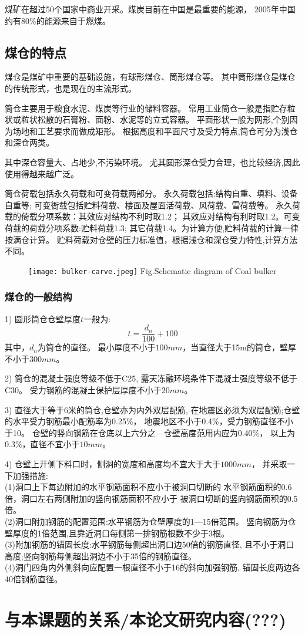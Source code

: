 煤矿在超过50个国家中商业开采。煤炭目前在中国是最重要的能源，
2005年中国约有$80\%$的能源来自于燃煤。

\subsection{煤仓的特点}
煤仓是煤矿中重要的基础设施，有球形煤仓、筒形煤仓等。
其中筒形煤仓是煤仓的传统形式，也是现在的主流形式。

筒仓主要用于粮食水泥、煤炭等行业的储料容器。
常用工业筒仓一般是指贮存粒状或粒状松散的石膏粉、面粉、水泥等的立式容器。
平面形状一般为网形,个别因为场地和工艺要求而做成矩形。
根据高度和平面尺寸及受力特点,筒仓可分为浅仓和深仓两类。

其中深仓容量大、占地少,不污染环境。
尤其圆形深仓受力合理，也比较经济,因此使用得越来越广泛。

筒仓荷载包括永久荷载和可变荷载两部分。
永久荷载包括:结构自重、填料、设备自重等;
可变衙载包括贮料荷载、楼面及屋面活荷载、风荷载、雪荷载等。
永久荷载的倚载分项系数：其效应对结构不利时取1.2；
其效应对结构有利时取1.2。可变荷载的荷载分项系数:贮料荷载1.3;
其它荷载1.4。为计算方便,贮料荷载的计算一律按满仓计算。
贮料荷载对仓壁的压力标准值，根据浅仓和深仓受力特性,计算方法不同。
\begin{figure}[!htbp]
   \centering
   \texttt{[image: bulker-carve.jpeg]}
								{Fig.}{Schematic diagram of Coal bulker}
\end{figure}

\subsubsection*{煤仓的一般结构}
1) 圆形筒仓仓壁厚度$t$一般为:
\begin{equation}
t=\frac{d_n}{100}+100
\end{equation}
其中，$d_n$为筒仓的直径。
最小厚度不小于$100mm$，当直径大于15m的筒仓，壁厚不小于$300mm$。

2) 筒仓的混凝土强度等级不低于C25,
	露天冻融环境条件下混凝土强度等级不低于C30。
	受力钢筋的混凝土保护层厚度不小于$20mm$。

3) 直径大于等于6米的筒仓,仓壁亦为内外双层配筋,
	在地震区必须为双层配筋;仓壁的水平受力钢筋最小配筋率为0.25\%，
	地震地区不小于0.4\%，受力钢筋直径不小于10。
	仓壁的竖向钢筋在仓底以上六分之—仓壁高度范用内应为0.40\%，
	以上为0.3\%，直径不宜小于$10mm$。

4) 仓壁上开侧下料口时，侧洞的宽度和高度均不宜大于大于$1000mm$，
	并采取一下加强措施:\\
    (1)洞口上下每边附加的水平钢筋面积不应小于被洞口切断的
	水平钢筋面积的0.6倍，洞口左右两侧附加的竖向钢筋面积不应小于
	被洞口切断的竖向钢筋面积的0.5倍。\\
    (2)洞口附加钢筋的配置范围:水平钢筋为仓壁厚度的1—15倍范围。
	竖向钢筋为仓壁厚度的1倍范围,且靠近洞口每侧第一排钢筋根数不少于3根。\\
    (3)附加钢筋的锚固长度:水平钢筋每侧超出洞口边50倍的钢筋直径,
	且不小于洞口高度;竖向钢筋每侧超出洞边不小于35倍的钢筋直径。\\
    (4)洞门四角内外侧斜向应配置一根直径不小于16的斜向加强钢筋,
	锚固长度两边各40倍钢筋直径。

	
\section{与本课题的关系/本论文研究内容(???)}

